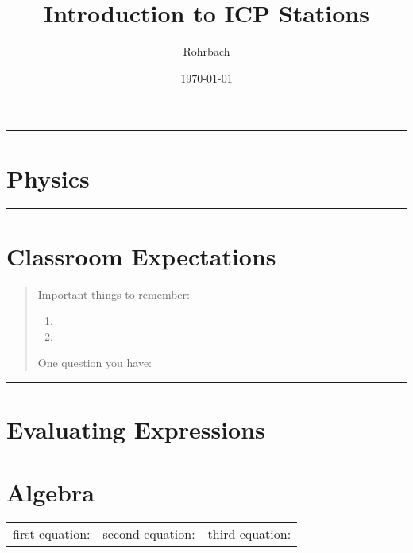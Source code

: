 \documentclass[10pt]{exam}
\title{Introduction to ICP Stations}
\author{Rohrbach}
\date{\today}
\begin{document}
\maketitle
\vspace{1em}

\hrule

\section{Physics}

\vs[2]

\hrule

\vspace{1em}

\section{Classroom Expectations}

\begin{quote}
Important things to remember:


\begin{enumerate}
\item 
\item \vs
\end{enumerate}
\vs

\noindent One question you have:
\vs

\end{quote}

\hrule

\section{Evaluating Expressions}


\begin{center}
\end{center}

\vspace{1em}

\pagebreak

\section{Algebra} 

\begin{center}
	\begin{tabular}
		{ m{} | m{}| m{} } 
		first equation: & second equation: & third equation:  \\[20em]
	\end{tabular}
\end{center}
\end{document}
